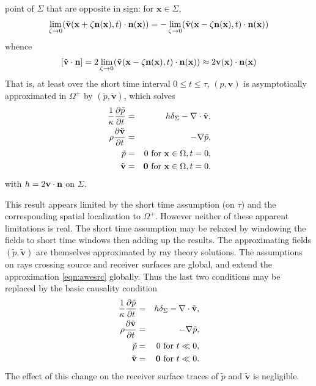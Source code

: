 \documentclass[georeport,12pt]{geophysics}
\newcommand{\bx}{\mathbf{x}}
\newcommand{\bv}{\mathbf{v}}
\begin{document}
point of $\Sigma$ 
that are opposite in sign: for $\bx \in \Sigma$,
\[
  \lim_{\zeta \rightarrow 0} (\tilde{\bv}(\bx+\zeta {\bf n}(\bx),t) \cdot {\bf
    n}(\bx)) = 
-\lim_{\zeta \rightarrow 0} (\tilde{\bv}(\bx-\zeta {\bf n}(\bx),t) \cdot {\bf
  n}(\bx))
\]
whence
\begin{equation}
   \label{eqn:vjump}
   [\tilde{\bv} \cdot {\bf n}] = 2 \lim_{\zeta
  \rightarrow 0} (\tilde{\bv}(\bx -\zeta {\bf
  n}(\bx),t) \cdot {\bf n}(\bx))
\approx 2 \bv(\bx) \cdot {\bf n}(\bx)
\end{equation}
That is, at least over the short time interval $0 \le t \le \tau$,
$(p,\bv)$ is asymptotically approximated in $\Omega^+$ by
$(\tilde{p},\tilde{\bv})$, which solves
\begin{eqnarray}
\label{eqn:awesrc}
  \frac{1}{\kappa}\frac{\partial\tilde{p}}{\partial t} & = & h \delta_{\Sigma}
                                                      - \nabla \cdot \tilde{\bv}, \nonumber \\
  \rho\frac{\partial \tilde{\bv}}{\partial t} & = & - \nabla \tilde{p}, \nonumber \\
  \tilde{p} & = & 0 \mbox{ for } \bx \in \Omega, t=0, \nonumber \\
  \tilde{\bv} & = & {\bf 0} \mbox{ for } \bx \in \Omega, t = 0.       
\end{eqnarray}
with $h = 2 \bv \cdot {\bf n}$ on $\Sigma$.

This result appears limited by the short time assumption (on $\tau$)
and the corresponding spatial localization to $\Omega^+$. However
neither of these apparent limitations is real. The short time
assumption may be relaxed by windowing the fields to short time
windows then adding up the results. The approximating fields
$(\tilde{p}, \tilde{\bv})$ are themselves approximated by ray
theory solutions. The assumptions on rays crossing source and receiver
surfaces are global, and extend the approximation \ref{eqn:awesrc}
globally. Thus the last two conditions may be replaced by the basic
causality condition
\begin{eqnarray}
  \label{eqn:awesrcmod}
  \frac{1}{\kappa}\frac{\partial\tilde{p}}{\partial t} & = & h \delta_{\Sigma}
                                                      - \nabla \cdot \tilde{\bv}, \nonumber \\
  \rho\frac{\partial \tilde{\bv}}{\partial t} & = & - \nabla \tilde{p}, \nonumber \\
  \tilde{p} & = & 0 \mbox{ for }  t \ll 0, \nonumber \\
  \tilde{\bv} & = & {\bf 0} \mbox{ for } t \ll 0.       
\end{eqnarray}
The effect of this change on the receiver surface traces of $\tilde{p}$ and
$\tilde{\bv}$ is negligible.
\end{document}
